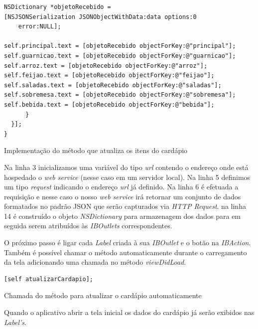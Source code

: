\documentclass[a4paper,12pt,brazil,doubleside]{book}
\begin{document}
\begin{singlespace}
\begin{listing}[H]
\begin{verbatim}
NSDictionary *objetoRecebido = 
[NSJSONSerialization JSONObjectWithData:data options:0
 	error:NULL];
             
self.principal.text = [objetoRecebido objectForKey:@"principal"];
self.guarnicao.text = [objetoRecebido objectForKey:@"guarnicao"];
self.arroz.text = [objetoRecebido objectForKey:@"arroz"];
self.feijao.text = [objetoRecebido objectForKey:@"feijao"];
self.saladas.text = [objetoRecebido objectForKey:@"saladas"];
self.sobremesa.text = [objetoRecebido objectForKey:@"sobremesa"];
self.bebida.text = [objetoRecebido objectForKey:@"bebida"];
      }
  }];
}
\end{verbatim}
\caption{Implementação do método que atualiza os itens do cardápio}
\end{listing}

Na linha 3 inicializamos uma variável do tipo \emph{url} contendo o endereço onde está hospedado o \emph{web service} (nesse caso em um servidor local). Na linha 5 definimos um tipo \emph{request} indicando o endereço \emph{url} já definido. Na linha 6 é efetuada a requisição e nesse caso o nosso \emph{web service} irá retornar um conjunto de dados formatados no padrão JSON que serão capturados via \emph{HTTP Request}. na linha 14 é construído o objeto \emph{NSDictionary} para armazenagem dos dados para em seguida serem atribuídos às \emph{IBOutlets} correspondentes.

 O próximo passo é ligar cada \emph{Label} criada à sua \emph{IBOutlet} e o botão na \emph{IBAction}. Também é possível chamar o método automaticamente durante o carregamento da tela adicionando uma chamada no método \emph{viewDidLoad}.

\begin{listing}[H]
\begin{verbatim}
[self atualizarCardapio];
\end{verbatim}
\caption{Chamada do método para atualizar o cardápio automaticamente}
\end{listing}

Quando o aplicativo abrir a tela inicial os dados do cardápio já serão exibidos nas \emph{Label's}.


\end{singlespace}
\end{document}
